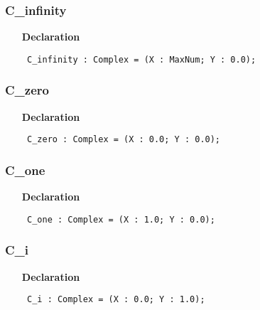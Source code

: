 \documentclass[12pt,a4paper,oneside]{report}
\newcommand{\declarationitem}[1]{\textbf{#1}}
\newcommand{\code}[1]{\texttt{#1}}
\begin{document}
\subsubsection{C{\_}infinity}
\label{utypes-C_infinity}
\begin{itemize}\item[\declarationitem{Declaration}\hfill]
	\begin{flushleft}
		\code{
			C{\_}infinity : Complex = (X : MaxNum; Y : 0.0);}
		
	\end{flushleft}
	
\end{itemize}
\subsubsection{C{\_}zero}
\label{utypes-C_zero}
\begin{itemize}\item[\declarationitem{Declaration}\hfill]
	\begin{flushleft}
		\code{
			C{\_}zero     : Complex = (X : 0.0;    Y : 0.0);}
		
	\end{flushleft}
	
\end{itemize}
\subsubsection{C{\_}one}
\label{utypes-C_one}
\begin{itemize}\item[\declarationitem{Declaration}\hfill]
	\begin{flushleft}
		\code{
			C{\_}one      : Complex = (X : 1.0;    Y : 0.0);}
		
	\end{flushleft}
	
\end{itemize}
\subsubsection{C{\_}i}
\label{utypes-C_i}
\begin{itemize}\item[\declarationitem{Declaration}\hfill]
	\begin{flushleft}
		\code{
			C{\_}i        : Complex = (X : 0.0;    Y : 1.0);}
		
	\end{flushleft}
	
\end{itemize}
\end{document}
